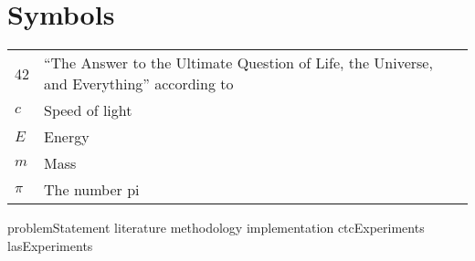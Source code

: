 \documentclass[master=ewit,english]{kulemt}
\begin{document}
\section*{Symbols}
\begin{flushleft}
  \renewcommand{\arraystretch}{1.1}
  \begin{tabularx}{\textwidth}{@{}p{12mm}X@{}}
    42    & ``The Answer to the Ultimate Question of Life, the Universe,
            and Everything'' according to  \\
    $c$   & Speed of light \\
    $E$   & Energy \\
    $m$   & Mass \\
    $\pi$ & The number pi \\
  \end{tabularx}
\end{flushleft}

\mainmatter

{problemStatement}
{literature}
{methodology}
{implementation}
{ctcExperiments}
{lasExperiments}

%
%

\backmatter


\end{document}
